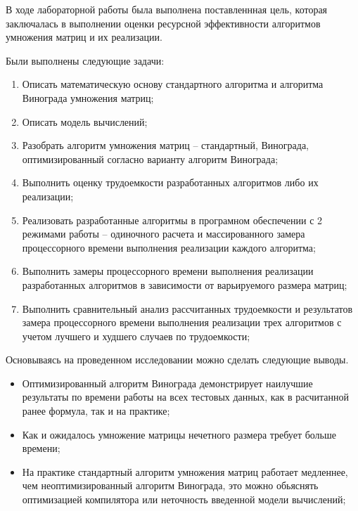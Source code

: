 
В ходе лабораторной работы была выполнена поставленнная цель, которая заключалась в выполнении оценки ресурсной эффективности алгоритмов умножения матриц и их реализации.

Были выполнены следующие задачи:
\begin{enumerate}
	\item Описать математическую основу стандартного алгоритма и алгоритма Винограда умножения матриц;
	\item Описать модель вычислений;
	\item Разобрать алгоритм умножения матриц -- стандартный, Винограда, оптимизированный согласно варианту алгоритм Винограда;
	\item Выполнить оценку трудоемкости разработанных алгоритмов либо их реализации;
	\item Реализовать разработанные алгоритмы в програмном обеспечении с 2 режимами работы -- одиночного расчета и массированного замера процессорного времени выполнения реализации каждого алгоритма;
	\item Выполнить замеры процессорного времени выполнения реализации разработанных алгоритмов в зависимости от варьируемого размера матриц;
	\item Выполнить сравнительный анализ рассчитанных трудоемкости и результатов замера процессорного времени выполнения реализации трех алгоритмов с учетом лучшего и худшего случаев по трудоемкости;
\end{enumerate}


Основываясь на проведенном исследовании можно сделать следующие выводы.
\begin{itemize}
	\item{Оптимизированный алгоритм Винограда демонстрирует наилучшие результаты по времени работы на всех тестовых данных, как в расчитанной ранее формула, так и на практике;}
	\item{Как и ожидалось умножение матрицы нечетного размера требует больше времени;}
	\item{На практике стандартный алгоритм умножения матриц работает медленнее, чем неоптимизированный алгоритм Винограда, это можно обьяснять оптимизацией компилятора или неточность введенной модели вычислений;}
\end{itemize}
